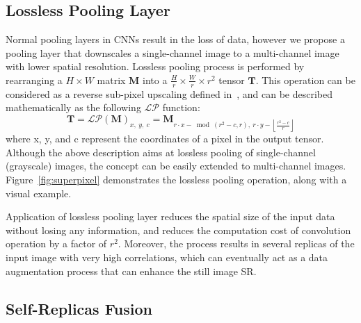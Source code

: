 \documentclass[10pt,twocolumn,letterpaper]{article}
\begin{document}
\subsection{Lossless Pooling Layer}
\label{sec:superpixel}

Normal pooling layers in CNNs result in the loss of data, however we propose
a pooling layer that downscales a single-channel image to a multi-channel image with lower spatial resolution.
Lossless pooling process is performed by rearranging a $H \times W$ matrix $\mathbf{M}$ into
a $\frac{H}{r} \times \frac{W}{r} \times r^2$ tensor $\mathbf{T}$. This operation can be considered
as a reverse sub-pixel upscaling defined in~\cite{shi2016}, and can be described mathematically
as the following $\mathcal{LP}$ function:
\begin{equation}
\label{eq:1}
\mathbf{T} = {\mathcal{LP}(\mathbf{M})}_{x,\ y,\ c} = \mathbf{M}_{r\cdot x -\bmod(r^2 - c, r),\ r\cdot y - \left \lfloor \frac{r^2-c}{r} \right \rfloor}
\end{equation}
where x, y, and c represent the coordinates of a pixel in the output tensor. Although the
above description aims at lossless pooling of single-channel (grayscale) images, the
concept can be easily extended to multi-channel images. Figure~\ref{fig:superpixel}
demonstrates the lossless pooling operation, along with a visual example.

Application of lossless pooling layer reduces the spatial size of the input data without
losing any information, and reduces the computation cost of convolution operation by a factor
of $r^2$. Moreover, the process results in several replicas of the input image
with very high correlations, which can eventually act as a data augmentation process that can 
enhance the still image SR.

\subsection{Self-Replicas Fusion}
\label{multi}
\end{document}
